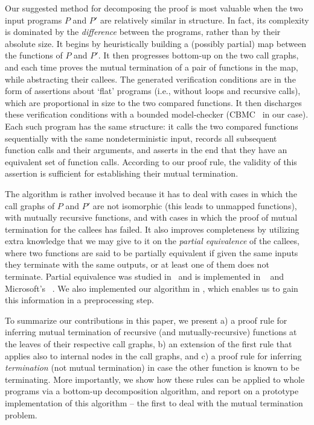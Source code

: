 Our suggested method for decomposing the proof is most valuable when the two
input programs $P$ and $P'$ are relatively similar in structure. In fact, its
complexity is dominated by the \emph{difference} between the programs, rather
than by their absolute size. It begins by heuristically building a (possibly
partial) map between the functions of $P$ and $P'$. It then progresses
bottom-up on the two call graphs, and each time proves the mutual termination
of a pair of functions in the map, while abstracting their callees. The
generated verification conditions are in the form of assertions about `flat' programs (i.e., without
loops and recursive calls), which are proportional in size to the two compared
functions. It then discharges these verification conditions with a bounded
model-checker (CBMC~\cite{CK03} in our case). Each such program has the same
structure: it calls the two compared functions sequentially with the same
nondeterministic input, records all subsequent function calls and their
arguments, and asserts in the end that they have an equivalent set of function
calls. According to our proof rule, the validity of this assertion is
sufficient for establishing their mutual termination.


The algorithm is rather involved because it has to deal with cases in which the
call graphs of $P$ and $P'$ are not isomorphic (this leads to unmapped
functions), with mutually recursive functions, and with cases in which the
proof of mutual termination for the callees has failed. It also improves completeness by utilizing extra
knowledge that we may give to it on the \emph{partial equivalence} of the
callees, where two functions are said to be partially equivalent if given the
same inputs they terminate with the same outputs, or at least one of them does
not terminate.
Partial equivalence was studied in~\cite{GS08,GS09} and is implemented in ~\cite{GS09} and Microsoft's
~\cite{KLR10}. We also implemented our algorithm in , which enables us to gain this information in a preprocessing step.


To summarize our contributions in this paper, we present a) a proof rule for inferring mutual termination of recursive (and mutually-recursive) functions at the leaves of their respective call graphs,
 b) an extension of the first rule that applies also to internal nodes in the call graphs, and c) a proof rule for inferring \emph{termination} (not mutual termination) in case the other function is known to be terminating. More importantly, we show how these rules can be applied to whole programs via a bottom-up decomposition algorithm, and report on a prototype implementation of this algorithm -- the first to deal with the mutual termination problem.

